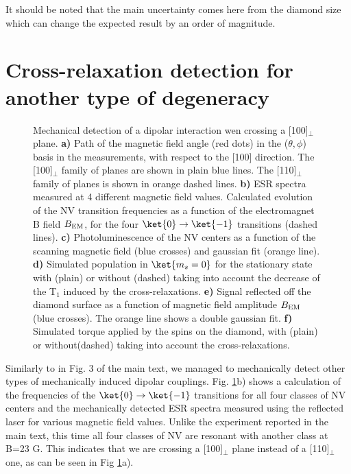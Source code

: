 \documentclass[preprintnumbers,amsmath,amssymb,onecolumn,12pt]{revtex4}
\begin{document}
It should be noted that the main uncertainty comes here from the diamond size which can change the expected result by an order of magnitude.

\section{Cross-relaxation detection for another type of degeneracy}

\begin{figure}[!ht]
  \centering {}
  \caption{Mechanical detection of a dipolar interaction wen crossing a [100]$_\perp$ plane. \textbf{a)} Path of the magnetic field angle (red dots) in the ($\theta , \phi$) basis in the measurements, with respect to the [100] direction. The [100]$_\perp$ family of planes are shown in plain blue lines. The [110]$_\perp$ family of planes is shown in orange dashed lines. \textbf{b)} ESR spectra measured at 4 different magnetic field values. Calculated evolution of the NV transition frequencies as a function of the electromagnet B field $B_{\rm EM}$, for the four $\ket{0} \to \ket{-1}$ transitions (dashed lines). \textbf{c)} Photoluminescence of the NV centers as a function of the scanning magnetic field (blue crosses) and gaussian fit (orange line). \textbf{d)} Simulated population in $\ket{m_s=0}$ for the stationary state with (plain) or without (dashed) taking into account the decrease of the T$_1$ induced by the cross-relaxations.
  \textbf{e)} Signal reflected off the diamond surface as a function of magnetic field amplitude $B_{\rm EM}$ (blue crosses). The orange line shows a double gaussian fit. \textbf{f)} Simulated torque applied by the spins on the diamond, with (plain) or without(dashed) taking into account the cross-relaxations.}
	\label{CR_22}
\end{figure}

Similarly to in Fig. 3 of the main text, we managed to mechanically detect other types of mechanically induced dipolar couplings.
Fig. \ref{CR_22}b) shows a calculation of the frequencies of the $\ket{0} \to \ket{-1}$ transitions for all four classes of NV centers and the mechanically detected ESR spectra measured using the reflected laser for various magnetic field values. Unlike the experiment reported in the main text, this time all four classes of NV are resonant with another class at B=23 G. This indicates that we are crossing a [100]$_\perp$ plane instead of a [110]$_\perp$ one, as can be seen in Fig \ref{CR_22}a).
\end{document}
